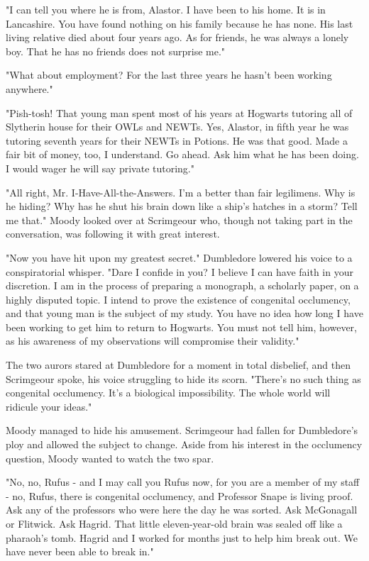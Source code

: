 "I can tell you where he is from, Alastor. I have been to his home. It is in Lancashire. You have found nothing on his family because he has none. His last living relative died about four years ago. As for friends, he was always a lonely boy. That he has no friends does not surprise me."

"What about employment? For the last three years he hasn't been working anywhere."

"Pish-tosh! That young man spent most of his years at Hogwarts tutoring all of Slytherin house for their OWLs and NEWTs. Yes, Alastor, in fifth year he was tutoring seventh years for their NEWTs in Potions. He was that good. Made a fair bit of money, too, I understand. Go ahead. Ask him what he has been doing. I would wager he will say private tutoring."

"All right, Mr. I-Have-All-the-Answers. I'm a better than fair legilimens. Why is he hiding? Why has he shut his brain down like a ship's hatches in a storm? Tell me that." Moody looked over at Scrimgeour who, though not taking part in the conversation, was following it with great interest.

"Now you have hit upon my greatest secret." Dumbledore lowered his voice to a conspiratorial whisper. "Dare I confide in you? I believe I can have faith in your discretion. I am in the process of preparing a monograph, a scholarly paper, on a highly disputed topic. I intend to prove the existence of congenital occlumency, and that young man is the subject of my study. You have no idea how long I have been working to get him to return to Hogwarts. You must not tell him, however, as his awareness of my observations will compromise their validity."

The two aurors stared at Dumbledore for a moment in total disbelief, and then Scrimgeour spoke, his voice struggling to hide its scorn. "There's no such thing as congenital occlumency. It's a biological impossibility. The whole world will ridicule your ideas."

Moody managed to hide his amusement. Scrimgeour had fallen for Dumbledore's ploy and allowed the subject to change. Aside from his interest in the occlumency question, Moody wanted to watch the two spar.

"No, no, Rufus - and I may call you Rufus now, for you are a member of my staff - no, Rufus, there is congenital occlumency, and Professor Snape is living proof. Ask any of the professors who were here the day he was sorted. Ask McGonagall or Flitwick. Ask Hagrid. That little eleven-year-old brain was sealed off like a pharaoh's tomb. Hagrid and I worked for months just to help him break out. We have never been able to break in."

